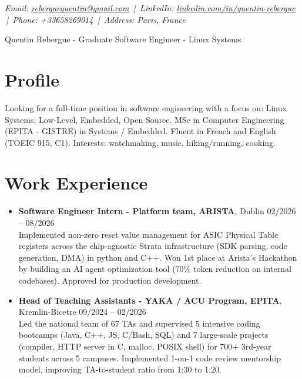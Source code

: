 \documentclass[9pt,a4paper]{article}
\newcommand{\namefont}{\fontsize{20}{22}\selectfont}
\newcommand{\tinyscript}{\fontsize{8}{9}\selectfont}
\begin{document}
\renewcommand\normalsize{\fontsize{10.5}{15}\selectfont}
\normalsize

\begin{center}
  {\tinyscript\itshape
  Email: \href{mailto:reberguequentin@gmail.com}{reberguequentin@gmail.com} \,|\,
  LinkedIn: \href{https://linkedin.com/in/quentin-rebergue}{linkedin.com/in/quentin-rebergue} \,|\,
  Phone: +33658269014 \,|\,
  Address: Paris, France}
\end{center}

\begin{center}
  {\namefont Quentin Rebergue - Graduate Software Engineer - Linux Systems}
\end{center}

\section*{Profile}
\begin{tcolorbox}[mybox2]
Looking for a full-time position in software engineering with a focus on: Linux Systems, Low-Level, Embedded, Open Source. MSc in Computer Engineering (EPITA - GISTRE) in Systems / Embedded. Fluent in French and English (TOEIC 915, C1). Interests: watchmaking, music, hiking/running, cooking.
\end{tcolorbox}

\section*{Work Experience}
\begin{tcolorbox}[mybox]
\begin{itemize}
\item\textbf{Software Engineer Intern - Platform team, ARISTA}, Dublin \hfill {\small02/2026 – 08/2026}\\[0.5em]
\textcolor{gray!40!black}{Implemented non-zero reset value management for ASIC Physical Table registers across the chip-agnostic Strata infrastructure (SDK parsing, code generation, DMA) in python and C++.
Won 1st place at Arista's Hackathon by building an AI agent optimization tool (70\% token reduction on internal codebases). Approved for production development.}

\item\textbf{Head of Teaching Assistants - YAKA / ACU Program, EPITA}, Kremlin-Bicetre \hfill {\small09/2024 – 02/2026}\\[0.5em]
\textcolor{gray!40!black}{Led the national team of 67 TAs and supervised 5 intensive coding bootcamps (Java, C++, JS, C/Bash, SQL) and 7 large-scale projects (compiler, HTTP server in C, malloc, POSIX shell) for 700+ 3rd-year students across 5 campuses. Implemented 1-on-1 code review mentorship model, improving TA-to-student ratio from 1:30 to 1:20.}
\end{itemize}
\end{tcolorbox}
\end{document}
